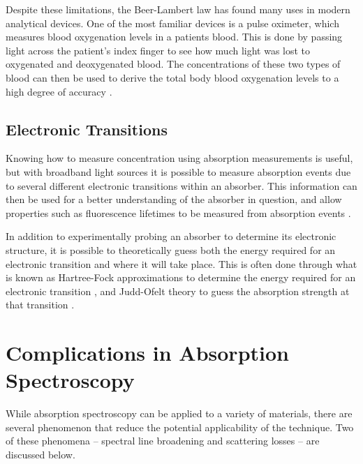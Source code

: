 
Despite these limitations, the Beer-Lambert law has found many uses in modern
analytical devices. One of the most familiar devices is a pulse oximeter, which
measures blood oxygenation levels in a patients blood. This is done by passing
light across the patient's index finger to see how much light was lost to
oxygenated and deoxygenated blood. The concentrations of these two types of
blood can then be used to derive the total body blood oxygenation levels to a
high degree of accuracy \cite{Wukitsch:1987tb}.



\subsection{Electronic Transitions}\label{subsec:elec_trans}


Knowing how to measure concentration using absorption measurements is useful,
but with broadband light sources it is possible to measure absorption events
due to several different electronic transitions within an absorber. This
information can then be used for a better understanding of the absorber in
question, and allow properties such as fluorescence lifetimes to be measured
from absorption events \cite{Werts:2002fs}.

In addition to experimentally probing an absorber to determine its electronic
structure, it is possible to theoretically guess both the energy required for
an electronic transition and where it will take place. This is often done
through what is known as Hartree-Fock approximations to determine the energy
required for an electronic transition \cite{Szabo:1996tu}, and Judd-Ofelt
theory to guess the absorption strength at that transition \cite{Judd:1962uq}.



\section{Complications in Absorption Spectroscopy}\label{sec:comp_abs}

While absorption spectroscopy can be applied to a variety of materials, there
are several phenomenon that reduce the potential applicability of the
technique. Two of these phenomena -- spectral line broadening and scattering
losses -- are discussed below.



